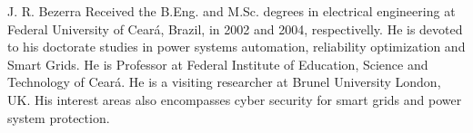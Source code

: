 \documentclass[journal]{IEEEtran}
\begin{document}
\vspace{-0.5in}
\begin{IEEEbiographynophoto}{J. R. Bezerra}
  Received the B.Eng. and M.Sc. degrees in electrical engineering at Federal University of Ceará, Brazil, in 2002 and 2004, respectivelly. He is devoted to his doctorate studies in power systems automation, reliability optimization and Smart Grids. He is  Professor at Federal Institute of Education, Science and Technology of Ceará. He is a visiting researcher at Brunel University London, UK. His interest areas also encompasses cyber security for smart grids and power system protection.
\end{IEEEbiographynophoto}

\end{document}
